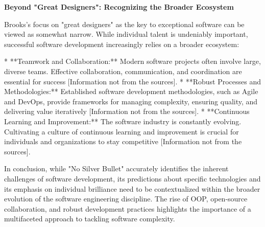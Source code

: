 \documentclass[a4paper, 12pt]{article}
\begin{document}
\textbf{Beyond "Great Designers": Recognizing the Broader Ecosystem}

Brooks's focus on "great designers" as the key to exceptional software can be viewed as somewhat narrow. While individual talent is undeniably important, successful software development increasingly relies on a broader ecosystem:

*   **Teamwork and Collaboration:** Modern software projects often involve large, diverse teams. Effective collaboration, communication, and coordination are essential for success [Information not from the sources].
*   **Robust Processes and Methodologies:** Established software development methodologies, such as Agile and DevOps, provide frameworks for managing complexity, ensuring quality, and delivering value iteratively [Information not from the sources]. 
*   **Continuous Learning and Improvement:** The software industry is constantly evolving. Cultivating a culture of continuous learning and improvement is crucial for individuals and organizations to stay competitive [Information not from the sources].

In conclusion, while "No Silver Bullet" accurately identifies the inherent challenges of software development, its predictions about specific technologies and its emphasis on individual brilliance need to be contextualized within the broader evolution of the software engineering discipline. The rise of OOP, open-source collaboration, and robust development practices highlights the importance of a multifaceted approach to tackling software complexity.
\end{document}
